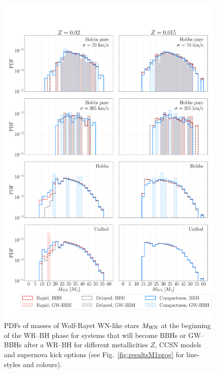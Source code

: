 \documentclass[a4paper,titlepage]{book}     	%
\begin{document}
\begin{figure}[h!]
	\centering
	\includegraphics[width=\textwidth]{./images/WRBH-MWRnonpureHe.pdf}	
	\caption{PDFs of masses of Wolf-Rayet WN-like stars $M_{\rm WN}$ at the beginning of the WR--BH phase for systems that will become BBHs or GW--BBHs after a WR--BH for different metallicities $Z$, CCSN models and supernova kick options (see Fig.\ \ref{fig:resultsM1prog} for line-styles and colours).}\label{fig:resultsWRBH-MWRnonpureHe}
\end{figure}
\end{document}
